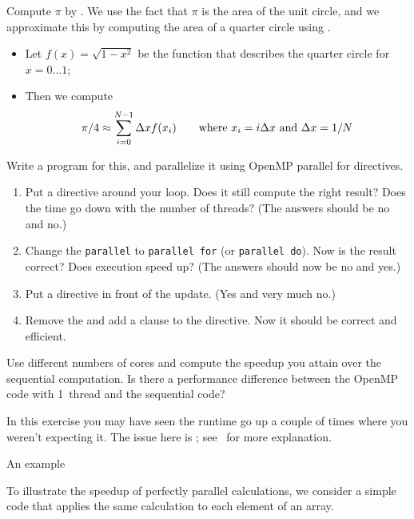\begin{exercise}
  \label{ex:omp-pi}
  Compute $\pi$ by . We use the fact that $\pi$
  is the area of the unit circle, and we approximate this by computing
  the area of a quarter circle using .
  \begin{itemize}
  \item Let $f(x)=\sqrt{1-x^2}$ be the function that describes the
    quarter circle for $x=0\ldots 1$;
  \item Then we compute \[ \pi/4\approx\sum_{i=0}^{N-1} \Delta x
    f(x_i) \qquad \hbox{where $x_i=i\Delta x$ and $\Delta x=1/N$} \]
  \end{itemize}
  Write a program for this, and parallelize it using OpenMP parallel
  for directives.
  \begin{enumerate}
  \item Put a  directive around your loop. Does it still
    compute the right result? Does the time go down with the number of
    threads? (The answers should be no and no.)
  \item Change the \lstinline{parallel} to \lstinline{parallel for}
    (or \lstinline{parallel do}). Now is the result correct? Does execution speed up? (The
    answers should now be no and yes.)
  \item Put a  directive in front of the update. (Yes and
    very much no.)
  \item Remove the  and add a clause
     to the  directive.
    Now it should be correct and efficient.
  \end{enumerate}
  Use different numbers of cores and compute the
  speedup you attain over the sequential computation. Is there a
  performance difference between the OpenMP code with 1~thread and the
  sequential code?
\end{exercise}

\begin{remark}
  In this exercise you may have seen the runtime go up a couple of times
  where you weren't expecting it. The issue here is ; see~ for more explanation.
\end{remark}

 {An example}

To illustrate the speedup of perfectly parallel calculations,
we consider a simple code that applies the same calculation
to each element of an array.

